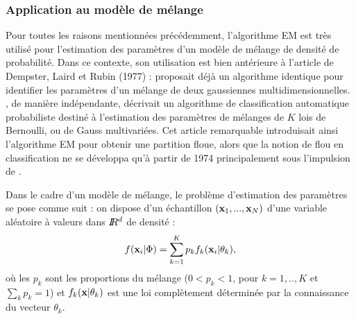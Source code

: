 % 


\subsubsection{Application au mod\`ele de m\'elange}









Pour toutes les raisons mentionn\'ees pr\'ec\'edemment,
l'algorithme EM est tr\`es utilis\'e pour l'estimation des param\`etres
d'un mod\`ele de m\'elange de densit\'e de probabilit\'e. 
Dans ce contexte, son utilisation est bien ant\'erieure \`a l'article 
de Dempster, Laird et Rubin (1977)  :  proposait d\'ej\`a 
un algorithme identique pour identifier les param\`etres d'un m\'elange de
deux gaussiennes multidimensionnelles. , de mani\`ere
ind\'ependante, d\'ecrivait un algorithme de classification automatique 
probabiliste destin\'e \`a l'estimation des param\`etres de m\'elanges
de $K$ lois de Bernoulli, ou de Gauss multivari\'ees. Cet article
remarquable introduisait ainsi l'algorithme EM pour obtenir une
partition floue, alors que la notion de flou en classification
ne se d\'eveloppa qu'\`a partir de 1974 principalement sous 
l'impulsion de .


Dans le cadre d'un mod\`ele de m\'elange, le probl\`eme d'estimation des 
param\`etres se pose comme suit :  on dispose d'un \'echantillon 
$(\mbox{\bf x}_1,...,\mbox{\bf x}_N)$
d'une variable al\'eatoire \`a valeurs dans $I\!\!R^d$ de densit\'e :
\begin{equation}
f(\mbox{\bf x}_i | \Phi)= \sum_{k=1}^{K} p_{k} f_k(\mbox{\bf x}_i | \theta_k), 
\end{equation}
o\`u les $p_k$ sont les proportions du m\'elange ($0<p_k<1$, pour $k=1,..,K$ et
$\sum_k p_k=1$) et $f_k(\mbox{\bf x} | \theta_k)$ est une loi compl\`etement 
d\'etermin\'ee par la connaissance du vecteur $\theta_k$.


